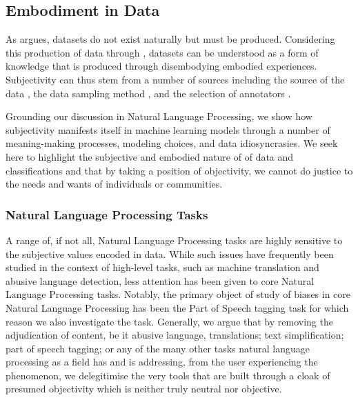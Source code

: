 \subsection{Embodiment in Data}
As \citet{Gitelman:2013} argues, datasets do not exist naturally but must be produced. Considering this production of data through \citet{Haraway:1988}, datasets can be understood as a form of knowledge that is produced through disembodying embodied experiences. Subjectivity can thus stem from a number of sources including the source of the data \cite{Gitelman-Jackson:2013}, the data sampling method \cite{Shah:2020}, and the selection of annotators \cite{Waseem:2016,Derczynski:2016}.

Grounding our discussion in Natural Language Processing, we show how subjectivity manifests itself in machine learning models through a number of meaning-making processes, modeling choices, and data idiosyncrasies. We seek here to highlight the subjective and embodied nature of of data and classifications and that by taking a position of objectivity, we cannot do justice to the needs and wants of individuals or communities.

\subsubsection{Natural Language Processing Tasks}

A range of, if not all, Natural Language Processing tasks are highly sensitive to the subjective values encoded in data. While such issues have frequently been studied in the context of high-level tasks, such as machine translation and abusive language detection, less attention has been given to core Natural Language Processing tasks. Notably, the primary object of study of biases in core Natural Language Processing has been the Part of Speech tagging task \cite{Blodgett:2016,Jorgensen:2016} for which reason we also investigate the task.
Generally, we argue that by removing the adjudication of content, be it abusive language, translations; text simplification; part of speech tagging; or any of the many other tasks natural language processing as a field has and is addressing, from the user experiencing the phenomenon, we delegitimise the very tools that are built through a cloak of presumed objectivity which is neither truly neutral nor objective.

